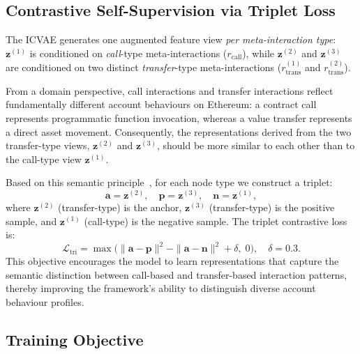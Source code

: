 \documentclass[conference]{IEEEtran}
\begin{document}
\subsection{Contrastive Self-Supervision via Triplet Loss}

The ICVAE generates one augmented feature view \emph{per
meta-interaction type}: $\mathbf{z}^{(1)}$ is conditioned on
\emph{call}-type meta-interactions ($r_{\mathrm{call}}$), while
$\mathbf{z}^{(2)}$ and $\mathbf{z}^{(3)}$ are conditioned on two
distinct \emph{transfer}-type meta-interactions
($r_{\mathrm{trans}}^{(1)}$ and $r_{\mathrm{trans}}^{(2)}$).

From a domain perspective, call interactions and transfer interactions
reflect fundamentally different account behaviours on Ethereum:
a contract call represents programmatic function invocation, whereas
a value transfer represents a direct asset movement.
Consequently, the representations derived from the two transfer-type
views, $\mathbf{z}^{(2)}$ and $\mathbf{z}^{(3)}$, should be more
similar to each other than to the call-type view $\mathbf{z}^{(1)}$.

Based on this semantic principle~\cite{paper_baseline_2408.00641},
for each node type we construct a triplet:
\begin{equation}
  \mathbf{a} = \mathbf{z}^{(2)},\quad
  \mathbf{p} = \mathbf{z}^{(3)},\quad
  \mathbf{n} = \mathbf{z}^{(1)},
\end{equation}
where $\mathbf{z}^{(2)}$ (transfer-type) is the anchor,
$\mathbf{z}^{(3)}$ (transfer-type) is the positive sample, and
$\mathbf{z}^{(1)}$ (call-type) is the negative sample.
The triplet contrastive loss is:
\begin{equation}
  \mathcal{L}_{\mathrm{tri}} =
    \max\!\bigl(
      \|\mathbf{a}-\mathbf{p}\|^2 - \|\mathbf{a}-\mathbf{n}\|^2
      + \delta,\; 0
    \bigr),
  \quad \delta = 0.3.
\end{equation}
This objective encourages the model to learn representations that
capture the semantic distinction between call-based and transfer-based
interaction patterns, thereby improving the framework's ability to
distinguish diverse account behaviour profiles.

\subsection{Training Objective}
\end{document}
